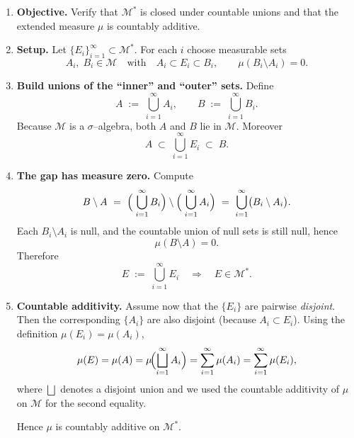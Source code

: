 \documentclass[12pt]{article}
\theoremstyle{definition} %
\theoremstyle{plain} %
\begin{document}
\pagebreak
\begin{enumerate}[label=\textbf{(iii)}]
  \item \textbf{Objective.}  
        Verify that $\mathcal{M}^{*}$ is closed under countable unions
        and that the extended measure $\mu$ is countably additive.

  \item \textbf{Setup.}  
        Let $\{E_i\}_{i=1}^{\infty}\subset\mathcal{M}^{*}$.  
        For each $i$ choose measurable sets 
        $$A_i,\;B_i\in\mathcal{M}\quad\text{with}\quad
              A_i\subset E_i\subset B_i,
              \qquad
              \mu(B_i\setminus A_i)=0.$$

  \item \textbf{Build unions of the ``inner'' and ``outer'' sets.}  
        Define
        \[
            A \;:=\;\bigcup_{i=1}^{\infty}A_i,
            \qquad
            B \;:=\;\bigcup_{i=1}^{\infty}B_i.
        \]
        Because $\mathcal{M}$ is a $\sigma$--algebra, both 
        $A$ and $B$ lie in $\mathcal{M}$.  
        Moreover
        \[
            A\;\subset\;\bigcup_{i=1}^{\infty}E_i\;\subset\;B .
        \]

  \item \textbf{The gap has measure zero.}  
        Compute
        \[
            B\setminus A
            ~=~\Bigl(\;\bigcup_{i=1}^{\infty}B_i\Bigr)
             \setminus
             \Bigl(\;\bigcup_{i=1}^{\infty}A_i\Bigr)
            ~=~\bigcup_{i=1}^{\infty}\bigl(B_i\setminus A_i\bigr).
        \]
        Each $B_i\setminus A_i$ is null, and the countable union of
        null sets is still null, hence
        \[
            \mu(B\setminus A)=0.
        \]
        Therefore
        \[
            E \;:=\;\bigcup_{i=1}^{\infty}E_i
            \quad\Longrightarrow\quad
            E\in\mathcal{M}^{*}.
        \]

  \item \textbf{Countable additivity.}  
        Assume now that the $\{E_i\}$ are pairwise \emph{disjoint}.  
        Then the corresponding $\{A_i\}$ are also disjoint
        (because $A_i\subset E_i$).  
        Using the definition $\mu(E_i)=\mu(A_i)$,
        \[
            \mu(E)
            =\mu(A)
            =\mu\!\Bigl(\bigsqcup_{i=1}^{\infty}A_i\Bigr)
            =\sum_{i=1}^{\infty}\mu(A_i)
            =\sum_{i=1}^{\infty}\mu(E_i),
        \]
        where $\bigsqcup$ denotes a disjoint union and we used the
        countable additivity of $\mu$ on $\mathcal{M}$ for the second equality.

        Hence $\mu$ is countably additive on $\mathcal{M}^{*}$.
\end{enumerate}
\end{document}
